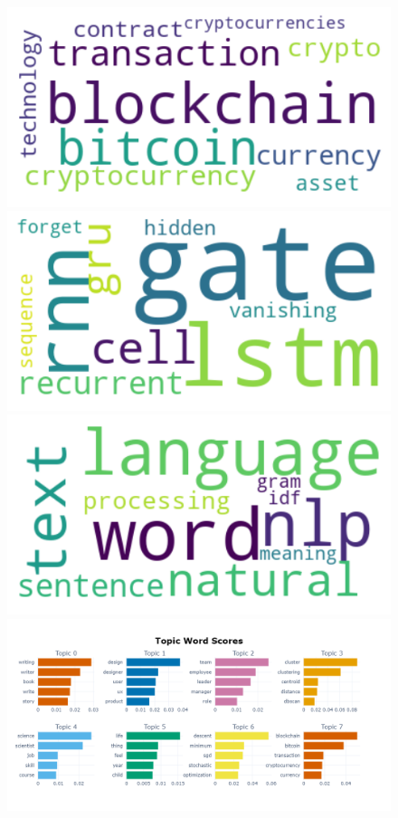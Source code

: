 \documentclass[12pt]{report}
\begin{document}
\begin{figure}[H]
    \centering
    \includegraphics[scale=0.4]{topic.png}
    \includegraphics[scale=0.4]{topic1.png}
    \includegraphics[scale=0.4]{topic2.png}
    \includegraphics[scale=0.4]{topic_score.png}
\end{figure}
\end{document}
